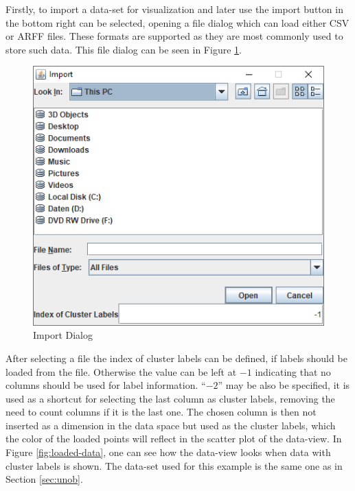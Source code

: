 \documentclass[
	a4paper,
	english,
	twoside,
	openright,               
	11pt                            
	]{report}
\begin{document}
 Firstly, to import a data-set for visualization and later use the import button in the bottom right can be selected, opening a file dialog which can load either CSV or ARFF files. These formats are supported as they are most commonly used to store such data. This file dialog can be seen in Figure \ref{fig:data-import}. 

\begin{figure}[h]
	\centering 
	\includegraphics[scale=.45]{data-import}%
	\caption{Import Dialog}
	\label{fig:data-import}
\end{figure}

After selecting a file the index of cluster labels can be defined, if labels should be loaded from the file. Otherwise the value can be left at $-1$ indicating that no columns should be used for label information. ``$-2$'' may be also be specified, it is used as a shortcut for selecting the last column as cluster labels, removing the need to count columns if it is the last one. The chosen column is then not inserted as a dimension in the data space but used as the cluster labels, which the color of the loaded points will reflect in the scatter plot of the data-view. In Figure \ref{fig:loaded-data}, one can see how the data-view looks when data with cluster labels is shown. The data-set used for this example is the same one as in Section \ref{sec:unob}.
\end{document}
